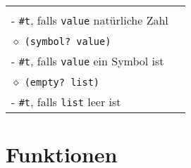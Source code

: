 \begin{tabular}{ | p{} p{} | }
{  \hspace{0.4cm} $\diamond$ \texttt{(natural? value)} \\
  \hspace{0.6cm} - \texttt{\#t}, falls \texttt{value} natürliche Zahl \\
  \hspace{0.4cm} $\diamond$ \texttt{(symbol? value)} \\
  \hspace{0.6cm} - \texttt{\#t}, falls \texttt{value} ein Symbol ist \\
  \hspace{0.4cm} $\diamond$ \texttt{(empty? list)} \\
  \hspace{0.6cm} - \texttt{\#t}, falls \texttt{list} leer ist} \\ \hline
  
  

  \end{tabular}

\section{Funktionen} 

